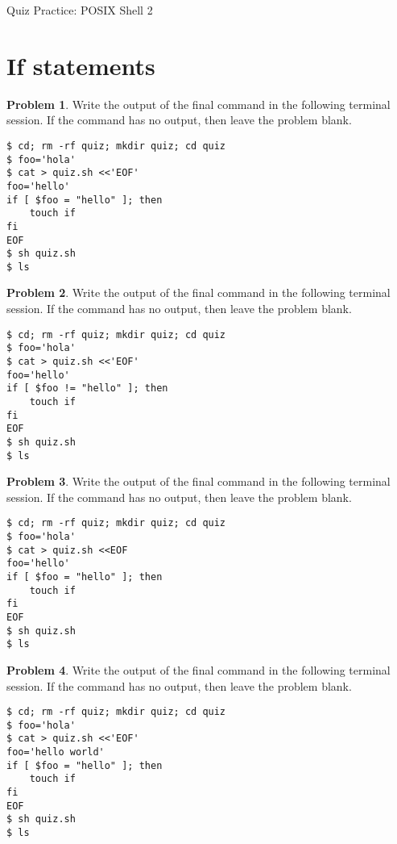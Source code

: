 \documentclass[10pt]{article}
\theoremstyle{definition}
\newtheorem{problem}{Problem}
\begin{document}
\begin{center}
    {
\Large
    Quiz Practice: POSIX Shell 2
}

    \vspace{0.1in}
\end{center}

\section{If statements}

\filbreak
\begin{problem}
    Write the output of the final command in the following terminal session.
    If the command has no output, then leave the problem blank.
\end{problem}
\begin{lstlisting}
$ cd; rm -rf quiz; mkdir quiz; cd quiz
$ foo='hola'
$ cat > quiz.sh <<'EOF'
foo='hello'
if [ $foo = "hello" ]; then
    touch if
fi
EOF
$ sh quiz.sh
$ ls
\end{lstlisting}


\filbreak
\begin{problem}
    Write the output of the final command in the following terminal session.
    If the command has no output, then leave the problem blank.
\end{problem}
\begin{lstlisting}
$ cd; rm -rf quiz; mkdir quiz; cd quiz
$ foo='hola'
$ cat > quiz.sh <<'EOF'
foo='hello'
if [ $foo != "hello" ]; then
    touch if
fi
EOF
$ sh quiz.sh
$ ls
\end{lstlisting}

\filbreak
\begin{problem}
    Write the output of the final command in the following terminal session.
    If the command has no output, then leave the problem blank.
\end{problem}
\begin{lstlisting}
$ cd; rm -rf quiz; mkdir quiz; cd quiz
$ foo='hola'
$ cat > quiz.sh <<EOF
foo='hello'
if [ $foo = "hello" ]; then
    touch if
fi
EOF
$ sh quiz.sh
$ ls
\end{lstlisting}


\filbreak
\begin{problem}
    Write the output of the final command in the following terminal session.
    If the command has no output, then leave the problem blank.
\end{problem}
\begin{lstlisting}
$ cd; rm -rf quiz; mkdir quiz; cd quiz
$ foo='hola'
$ cat > quiz.sh <<'EOF'
foo='hello world'
if [ $foo = "hello" ]; then
    touch if
fi
EOF
$ sh quiz.sh
$ ls
\end{lstlisting}
\end{document}
